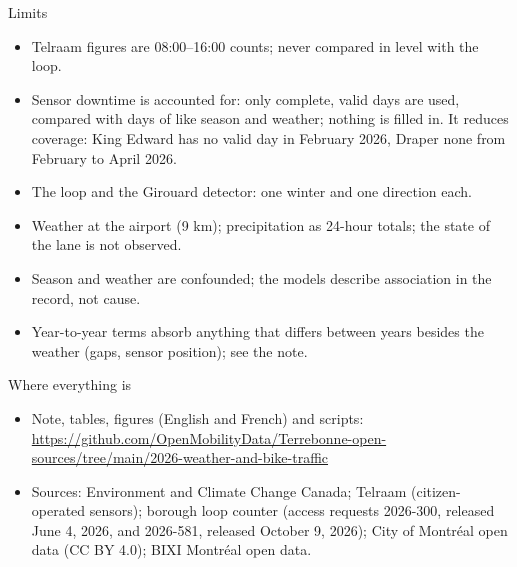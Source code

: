 \documentclass[aspectratio=169,10pt]{beamer}\usetheme{default}\usecolortheme{seahorse}\setbeamertemplate{navigation symbols}{}\setbeamertemplate{footline}[frame number]
\begin{document}
\begin{frame}{Limits}
\begin{itemize}
\item Telraam figures are 08:00--16:00 counts; never compared in level with the loop.
\item Sensor downtime is accounted for: only complete, valid days are used, compared with days of like season and weather; nothing is filled in. It reduces coverage: King Edward has no valid day in February 2026, Draper none from February to April 2026.
\item The loop and the Girouard detector: one winter and one direction each.
\item Weather at the airport (9 km); precipitation as 24-hour totals; the state of the lane is not observed.
\item Season and weather are confounded; the models describe association in the record, not cause.
\item Year-to-year terms absorb anything that differs between years besides the weather (gaps, sensor position); see the note.
\end{itemize}
\end{frame}
\begin{frame}{Where everything is}
\begin{itemize}
\item Note, tables, figures (English and French) and scripts: \url{https://github.com/OpenMobilityData/Terrebonne-open-sources/tree/main/2026-weather-and-bike-traffic}
\item Sources: Environment and Climate Change Canada; Telraam (citizen-operated sensors); borough loop counter (access requests 2026-300, released June 4, 2026, and 2026-581, released October 9, 2026); City of Montréal open data (CC BY 4.0); BIXI Montréal open data.
\end{itemize}
\end{frame}
\end{document}
